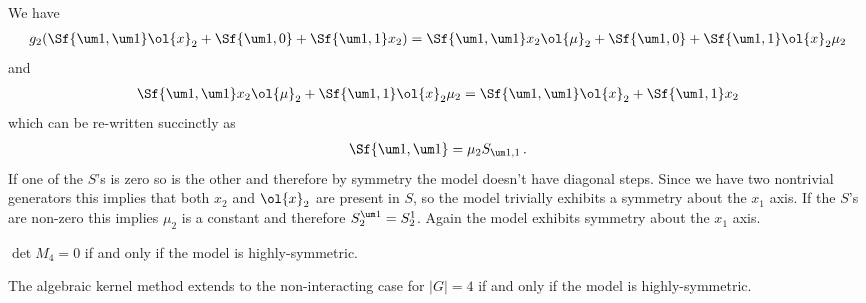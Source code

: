 We have
\begin{align}
	g_2 (\Sf{\um 1, \um 1}\ol{x}_2+\Sf{\um 1,0}+\Sf{\um 1,1}x_2) = \Sf{\um 1, \um 1}x_2 \ol{\mu}_2+\Sf{\um 1,0}+\Sf{\um 1,1}\ol{x}_2\mu_2
\end{align}
and
\begin{align}
	\Sf{\um 1, \um 1}x_2 \ol{\mu}_2+\Sf{\um 1,1}\ol{x}_2\mu_2 = \Sf{\um 1, \um 1}\ol{x}_2+\Sf{\um 1,1}x_2
\end{align}
which can be re-written succinctly as
\begin{align}
	\Sf{\um 1, \um 1} = \mu_2 S_{\um 1,1}\,.
\end{align}
If one of the $S$'s is zero so is the other and therefore by symmetry the model doesn't have diagonal steps. Since we have two nontrivial generators this implies that both $x_2$ and $\ol{x}_2$ are present in $S$, so the model trivially exhibits a symmetry about the $x_1$ axis. If the $S$'s are non-zero this implies $\mu_2$ is a constant and therefore $S_2^{\um 1} = S_2^1$. Again the model exhibits symmetry about the $x_1$ axis. 
\begin{theorem} $\det M_4 = 0$ if and only if the model is highly-symmetric.
\end{theorem}

\begin{corollary} The algebraic kernel method extends to the non-interacting case for $|G| = 4$ if and only if the model is highly-symmetric.
\end{corollary}

